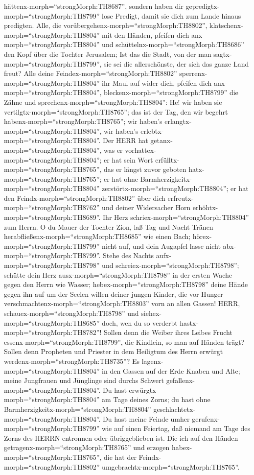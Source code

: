 hättenx-morph=``strongMorph:TH8687'', sondern haben dir
gepredigtx-morph=``strongMorph:TH8799'' lose Predigt, damit sie dich zum
Lande hinaus predigten.  Alle, die
vorübergehenx-morph=``strongMorph:TH8802'',
klatschenx-morph=``strongMorph:TH8804'' mit den Händen, pfeifen dich
anx-morph=``strongMorph:TH8804'' und
schüttelnx-morph=``strongMorph:TH8686'' den Kopf über die Tochter
Jerusalem; Ist das die Stadt, von der man
sagtx-morph=``strongMorph:TH8799'', sie sei die allerschönste, der sich
das ganze Land freut?  Alle deine
Feindex-morph=``strongMorph:TH8802''
sperrenx-morph=``strongMorph:TH8804'' ihr Maul auf wider dich, pfeifen
dich anx-morph=``strongMorph:TH8804'',
bleckenx-morph=``strongMorph:TH8799'' die Zähne und
sprechenx-morph=``strongMorph:TH8804'': He! wir haben sie
vertilgtx-morph=``strongMorph:TH8765''; das ist der Tag, den wir begehrt
habenx-morph=``strongMorph:TH8765''; wir haben's
erlangtx-morph=``strongMorph:TH8804'', wir haben's
erlebtx-morph=``strongMorph:TH8804''.  Der HERR hat
getanx-morph=``strongMorph:TH8804'', was er
vorhattex-morph=``strongMorph:TH8804''; er hat sein Wort
erfülltx-morph=``strongMorph:TH8765'', das er längst zuvor geboten
hatx-morph=``strongMorph:TH8765''; er hat ohne
Barmherzigkeitx-morph=``strongMorph:TH8804''
zerstörtx-morph=``strongMorph:TH8804''; er hat den
Feindx-morph=``strongMorph:TH8802'' über dich
erfreutx-morph=``strongMorph:TH8762'' und deiner Widersacher Horn
erhöhtx-morph=``strongMorph:TH8689''.  Ihr Herz
schriex-morph=``strongMorph:TH8804'' zum Herrn. O du Mauer der Tochter
Zion, laß Tag und Nacht Tränen
herabfließenx-morph=``strongMorph:TH8685'' wie einen Bach;
hörex-morph=``strongMorph:TH8799'' nicht auf, und dein Augapfel lasse
nicht abx-morph=``strongMorph:TH8799''.  Stehe des Nachts
aufx-morph=``strongMorph:TH8798'' und
schreiex-morph=``strongMorph:TH8798''; schütte dein Herz
ausx-morph=``strongMorph:TH8798'' in der ersten Wache gegen den Herrn
wie Wasser; hebex-morph=``strongMorph:TH8798'' deine Hände gegen ihn auf
um der Seelen willen deiner jungen Kinder, die vor Hunger
verschmachtenx-morph=``strongMorph:TH8803'' vorn an allen Gassen!
 HERR, schauex-morph=``strongMorph:TH8798'' und
siehex-morph=``strongMorph:TH8685'' doch, wen du so verderbt
hastx-morph=``strongMorph:TH8782''! Sollen denn die Weiber ihres Leibes
Frucht essenx-morph=``strongMorph:TH8799'', die Kindlein, so man auf
Händen trägt? Sollen denn Propheten und Priester in dem Heiligtum des
Herrn erwürgt werdenx-morph=``strongMorph:TH8735''?  Es
lagenx-morph=``strongMorph:TH8804'' in den Gassen auf der Erde Knaben
und Alte; meine Jungfrauen und Jünglinge sind durchs Schwert
gefallenx-morph=``strongMorph:TH8804''. Du hast
erwürgtx-morph=``strongMorph:TH8804'' am Tage deines Zorns; du hast ohne
Barmherzigkeitx-morph=``strongMorph:TH8804''
geschlachtetx-morph=``strongMorph:TH8804''.  Du hast meine
Feinde umher gerufenx-morph=``strongMorph:TH8799'' wie auf einen
Feiertag, daß niemand am Tage des Zorns des HERRN entronnen oder
übriggeblieben ist. Die ich auf den Händen
getragenx-morph=``strongMorph:TH8765'' und erzogen
habex-morph=``strongMorph:TH8765'', die hat der
Feindx-morph=``strongMorph:TH8802''
umgebrachtx-morph=``strongMorph:TH8765''.

